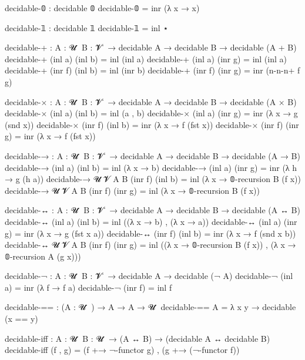 decidable-𝟘 : decidable 𝟘
decidable-𝟘 = inr (λ x → x)

decidable-𝟙 : decidable 𝟙
decidable-𝟙 = inl ⋆
 
decidable-+ : {A : 𝓤 ̇ } {B : 𝓥 ̇ } → decidable A → decidable B → decidable (A + B)
decidable-+ (inl a) (inl b) = inl (inl a)
decidable-+ (inl a) (inr g) = inl (inl a)
decidable-+ (inr f) (inl b) = inl (inr b)
decidable-+ (inr f) (inr g) = inr (n-n-n+ f g)

decidable-× : {A : 𝓤 ̇ } {B : 𝓥 ̇ } → decidable A → decidable B → decidable (A × B)
decidable-× (inl a) (inl b) = inl (a , b)
decidable-× (inl a) (inr g) = inr (λ x → g (snd x))
decidable-× (inr f) (inl b) = inr (λ x → f (fst x))
decidable-× (inr f) (inr g) = inr (λ x → f (fst x))

decidable-→ : {A : 𝓤 ̇ } {B : 𝓥 ̇ } → decidable A → decidable B → decidable (A → B)
decidable-→                 (inl a) (inl b) = inl (λ x → b)
decidable-→                 (inl a) (inr g) = inr (λ h → g (h a))
decidable-→ {𝓤} {𝓥} {A} {B} (inr f) (inl b) = inl (λ x → 𝟘-recursion B (f x))
decidable-→ {𝓤} {𝓥} {A} {B} (inr f) (inr g) = inl (λ x → 𝟘-recursion B (f x))

decidable-↔ : {A : 𝓤 ̇ } {B : 𝓥 ̇ } → decidable A → decidable B → decidable (A ↔ B)
decidable-↔                 (inl a) (inl b) = inl ((λ x → b) , (λ x → a))
decidable-↔                 (inl a) (inr g) = inr (λ x → g (fst x a))
decidable-↔                 (inr f) (inl b) = inr (λ x → f (snd x b))
decidable-↔ {𝓤} {𝓥} {A} {B} (inr f) (inr g) = inl ((λ x → 𝟘-recursion B (f x)) , (λ x → 𝟘-recursion A (g x)))

decidable-¬ : {A : 𝓤 ̇ } {B : 𝓥 ̇ } → decidable A → decidable (¬ A)
decidable-¬ (inl a) = inr (λ f → f a)
decidable-¬ (inr f) = inl f

decidable-== : (A : 𝓤 ̇ ) → A → A → 𝓤 ̇ 
decidable-== A = λ x y → decidable (x == y)

decidable-iff : {A : 𝓤 ̇ } {B : 𝓤 ̇ } → (A ↔ B) → (decidable A ↔ decidable B) 
decidable-iff (f , g) = (f +→ ¬-functor g) , (g +→ (¬-functor f)) 